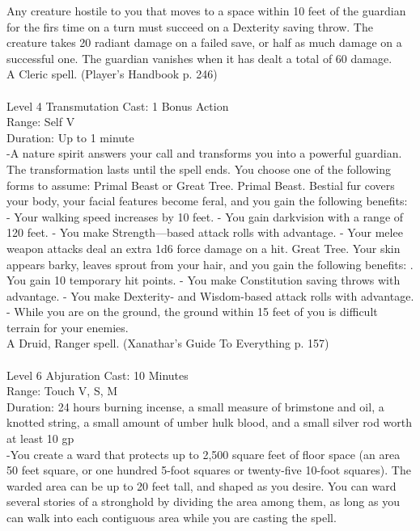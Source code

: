 \documentclass[10pt,twocolumn]{report}
\begin{document}
Any creature hostile to you that moves to a space within 10 feet of the guardian for the firs time on a turn must succeed on a Dexterity saving throw. The creature takes 20 radiant damage on a failed save, or half as much damage on a successful one. The guardian vanishes when it has dealt a total of 60 damage.\\
A Cleric spell. (Player's Handbook p. 246) \\


 \\
Level 4 \quad Transmutation \quad Cast: 1 Bonus Action\\
Range: Self \quad V\\
Duration: Up to 1 minute \quad \\
-A nature spirit answers your call and transforms you into a powerful guardian. The transformation lasts until the spell ends. You choose one of the following forms to assume: Primal Beast or Great Tree.
Primal Beast. Bestial fur covers your body, your facial features become feral, and you gain the following benefits:
- Your walking speed increases by 10 feet.
- You gain darkvision with a range of 120 feet.
- You make Strength—based attack rolls with advantage.
- Your melee weapon attacks deal an extra 1d6 force damage on a hit.
Great Tree. Your skin appears barky, leaves sprout from your hair, and you gain the following benefits:
. You gain 10 temporary hit points.
- You make Constitution saving throws with advantage.
- You make Dexterity- and Wisdom-based attack rolls with advantage.
- While you are on the ground, the ground within 15 feet of you is difficult terrain for your enemies.\\
A Druid, Ranger spell. (Xanathar's Guide To Everything p. 157) \\


 \\
Level 6 \quad Abjuration \quad Cast: 10 Minutes\\
Range: Touch \quad V, S, M\\
Duration: 24 hours \quad burning incense, a small measure of brimstone and oil, a knotted string, a small amount of umber hulk blood, and a small silver rod worth at least 10 gp\\
-You create a ward that protects up to 2,500 square feet of floor space (an area 50 feet square, or one hundred 5-foot squares or twenty-five 10-foot squares). The warded area can be up to 20 feet tall, and shaped as you desire. You can ward several stories of a stronghold by dividing the area among them, as long as you can walk into each contiguous area while you are casting the spell.
\end{document}
